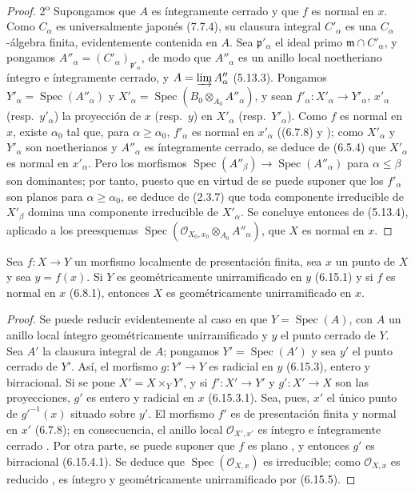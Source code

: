 \begin{proof}
2\textsuperscript{o} Supongamos que $A$ es íntegramente cerrado y que $f$ es normal en $x$. Como $C_\alpha$ es universalmente japonés (7.7.4), su clausura integral $C'_\alpha$ es una $C_\alpha$-álgebra finita, evidentemente contenida en $A$. Sea $\mathfrak p'_\alpha$ el ideal primo $\mathfrak m\cap C'_\alpha$, y pongamos $A''_\alpha=(C'_\alpha)_{\mathfrak p'_\alpha}$, de modo que $A''_\alpha$ es un anillo local noetheriano íntegro e íntegramente cerrado, y $A=\varinjlim A''_\alpha$ (5.13.3). Pongamos $Y'_\alpha=\operatorname{Spec}(A''_\alpha)$ y $X'_\alpha=\operatorname{Spec}(B_0\otimes_{A_0}A''_\alpha)$, y sean $f'_\alpha:X'_\alpha\to Y'_\alpha$, $x'_\alpha$ (resp.\ $y'_\alpha$) la proyección de $x$ (resp.\ $y$) en $X'_\alpha$ (resp.\ $Y'_\alpha$). Como $f$ es normal en $x$, existe $\alpha_0$ tal que, para $\alpha\geq\alpha_0$, $f'_\alpha$ es normal en $x'_\alpha$ ((6.7.8) y );  como $X'_\alpha$ y $Y'_\alpha$ son noetherianos y $A''_\alpha$ es íntegramente cerrado, se deduce de (6.5.4) que $X'_\alpha$ es normal en $x'_\alpha$. Pero los morfismos
$\operatorname{Spec}(A''_\beta)\to\operatorname{Spec}(A''_\alpha)$ para
$\alpha\leq\beta$
son dominantes; por tanto, puesto que en virtud de  se puede suponer que los $f'_\alpha$ son planos para $\alpha\geq\alpha_0$, se deduce de (2.3.7) que toda componente irreducible de $X'_\beta$ domina una componente irreducible de $X'_\alpha$. Se concluye entonces de (5.13.4), aplicado a los preesquemas
$\operatorname{Spec}(\mathcal O_{X_0,x_0}\otimes_{A_0}A''_\alpha)$,
que $X$ es normal en $x$.
\end{proof}

\begin{corollary}[11.3.14]
\label{IV.11.3.14}
Sea $f:X\to Y$ un morfismo localmente de presentación finita, sea $x$ un punto de $X$ y sea $y=f(x)$. Si $Y$ es geométricamente unirramificado en $y$ \textup{(6.15.1)} y si $f$ es normal en $x$ \textup{(6.8.1)}, entonces $X$ es geométricamente unirramificado en $x$.
\end{corollary}

\begin{proof}
Se puede reducir evidentemente al caso en que $Y=\operatorname{Spec}(A)$, con $A$ un anillo local íntegro geométricamente unirramificado y $y$ el punto cerrado de $Y$. Sea $A'$ la clausura integral de $A$; pongamos $Y'=\operatorname{Spec}(A')$ y sea $y'$ el punto cerrado de $Y'$. Así, el morfismo $g:Y'\to Y$ es radicial en $y$ (6.15.3), entero y birracional. Si se pone $X'=X\times_Y Y'$, y si $f':X'\to Y'$ y $g':X'\to X$ son las proyecciones, $g'$ es entero y radicial en $x$ (6.15.3.1). Sea, pues, $x'$ el único punto de $g'^{-1}(x)$ situado sobre $y'$. El morfismo $f'$ es de presentación finita y normal en $x'$ (6.7.8); en consecuencia, el anillo local $\mathcal O_{X',x'}$ es íntegro e íntegramente cerrado . Por otra parte, se puede suponer que $f$ es plano , y entonces $g'$ es birracional (6.15.4.1). Se deduce que $\operatorname{Spec}(\mathcal O_{X,x})$ es irreducible; como $\mathcal O_{X,x}$ es reducido , es íntegro y geométricamente unirramificado por (6.15.5).
\end{proof}

